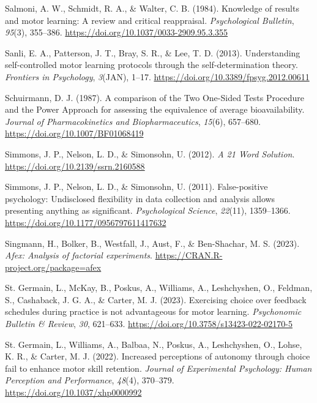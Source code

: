 \documentclass[
  doc, donotrepeattitle,floatsintext]{apa7}
\newlength{\cslhangindent}
\newlength{\cslentryspacingunit} %
\newenvironment{CSLReferences}[2] %
 {%
  \setlength{\parindent}{0pt}
  \ifodd #1
  \let\oldpar\par
  \def\par{\hangindent=\cslhangindent\oldpar}
  \fi
  \setlength{\parskip}{#2\cslentryspacingunit}
 }%
 {}
\begin{document}
\begin{CSLReferences}{1}{0}
\leavevmode{}%
Salmoni, A. W., Schmidt, R. A., \& Walter, C. B. (1984). Knowledge of results and motor learning: A review and critical reappraisal. \emph{Psychological Bulletin}, \emph{95}(3), 355--386. \url{https://doi.org/10.1037/0033-2909.95.3.355}

\leavevmode{}%
Sanli, E. A., Patterson, J. T., Bray, S. R., \& Lee, T. D. (2013). Understanding self-controlled motor learning protocols through the self-determination theory. \emph{Frontiers in Psychology}, \emph{3}(JAN), 1--17. \url{https://doi.org/10.3389/fpsyg.2012.00611}

\leavevmode{}%
Schuirmann, D. J. (1987). A comparison of the {Two One-Sided Tests Procedure} and the {Power Approach} for assessing the equivalence of average bioavailability. \emph{Journal of Pharmacokinetics and Biopharmaceutics}, \emph{15}(6), 657--680. \url{https://doi.org/10.1007/BF01068419}

\leavevmode{}%
Simmons, J. P., Nelson, L. D., \& Simonsohn, U. (2012). \emph{A 21 {Word Solution}}. \url{https://doi.org/10.2139/ssrn.2160588}

\leavevmode{}%
Simmons, J. P., Nelson, L. D., \& Simonsohn, U. (2011). False-positive psychology: {Undisclosed} flexibility in data collection and analysis allows presenting anything as significant. \emph{Psychological Science}, \emph{22}(11), 1359--1366. \url{https://doi.org/10.1177/0956797611417632}

\leavevmode{}%
Singmann, H., Bolker, B., Westfall, J., Aust, F., \& Ben-Shachar, M. S. (2023). \emph{Afex: Analysis of factorial experiments}. \url{https://CRAN.R-project.org/package=afex}

\leavevmode{}%
St. Germain, L., McKay, B., Poskus, A., Williams, A., Leshchyshen, O., Feldman, S., Cashaback, J. G. A., \& Carter, M. J. (2023). Exercising choice over feedback schedules during practice is not advantageous for motor learning. \emph{Psychonomic Bulletin \& Review}, \emph{30}, 621--633. \url{https://doi.org/10.3758/s13423-022-02170-5}

\leavevmode{}%
St. Germain, L., Williams, A., Balbaa, N., Poskus, A., Leshchyshen, O., Lohse, K. R., \& Carter, M. J. (2022). Increased perceptions of autonomy through choice fail to enhance motor skill retention. \emph{Journal of Experimental Psychology: Human Perception and Performance}, \emph{48}(4), 370--379. \url{https://doi.org/10.1037/xhp0000992}


\end{CSLReferences}
\end{document}
